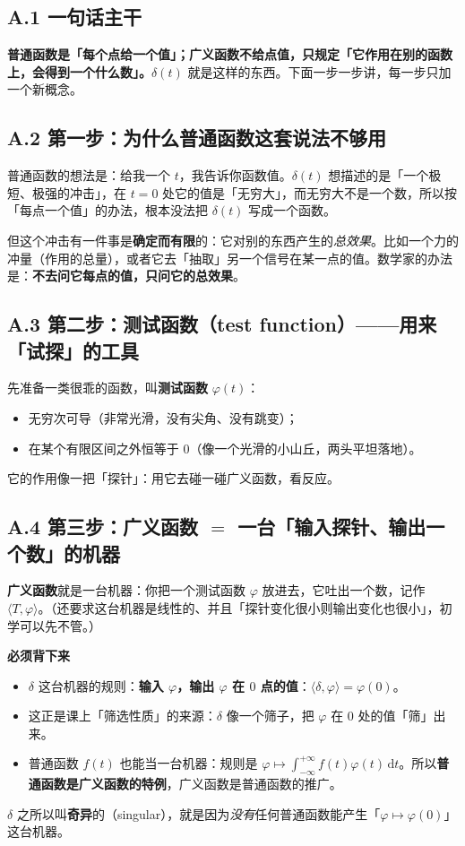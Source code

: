 \documentclass[UTF8,a4paper,11pt]{ctexart}
\newenvironment{remember}{\begin{rememberbox}\textbf{必须背下来}\par\smallskip}{\end{rememberbox}}
\renewcommand{\d}{\,\mathrm{d}}
\begin{document}
\subsection*{A.1 一句话主干}
\textbf{普通函数是「每个点给一个值」；广义函数不给点值，只规定「它作用在别的函数上，会得到一个什么数」。}$\delta(t)$ 就是这样的东西。下面一步一步讲，每一步只加一个新概念。

\subsection*{A.2 第一步：为什么普通函数这套说法不够用}
普通函数的想法是：给我一个 $t$，我告诉你函数值。$\delta(t)$ 想描述的是「一个极短、极强的冲击」，在 $t=0$ 处它的值是「无穷大」，而无穷大不是一个数，所以按「每点一个值」的办法，根本没法把 $\delta(t)$ 写成一个函数。

但这个冲击有一件事是\textbf{确定而有限}的：它对别的东西产生的\emph{总效果}。比如一个力的冲量（作用的总量），或者它去「抽取」另一个信号在某一点的值。数学家的办法是：\textbf{不去问它每点的值，只问它的总效果}。

\subsection*{A.3 第二步：测试函数（test function）——用来「试探」的工具}
先准备一类很乖的函数，叫\textbf{测试函数} $\varphi(t)$：
\begin{itemize}[nosep]
\item 无穷次可导（非常光滑，没有尖角、没有跳变）；
\item 在某个有限区间之外恒等于 $0$（像一个光滑的小山丘，两头平坦落地）。
\end{itemize}
它的作用像一把「探针」：用它去碰一碰广义函数，看反应。

\subsection*{A.4 第三步：广义函数 $=$ 一台「输入探针、输出一个数」的机器}
\textbf{广义函数}就是一台机器：你把一个测试函数 $\varphi$ 放进去，它吐出一个数，记作 $\langle T,\varphi\rangle$。（还要求这台机器是线性的、并且「探针变化很小则输出变化也很小」，初学可以先不管。）

\begin{remember}
\begin{itemize}[nosep]
\item $\delta$ 这台机器的规则：\textbf{输入 $\varphi$，输出 $\varphi$ 在 $0$ 点的值}：$\langle\delta,\varphi\rangle=\varphi(0)$。
\item 这正是课上「筛选性质」的来源：$\delta$ 像一个筛子，把 $\varphi$ 在 $0$ 处的值「筛」出来。
\item 普通函数 $f(t)$ 也能当一台机器：规则是 $\varphi\mapsto\int_{-\infty}^{+\infty}f(t)\varphi(t)\d t$。所以\textbf{普通函数是广义函数的特例}，广义函数是普通函数的推广。
\end{itemize}
\end{remember}
$\delta$ 之所以叫\textbf{奇异}的（singular），就是因为\emph{没有}任何普通函数能产生「$\varphi\mapsto\varphi(0)$」这台机器。
\end{document}
